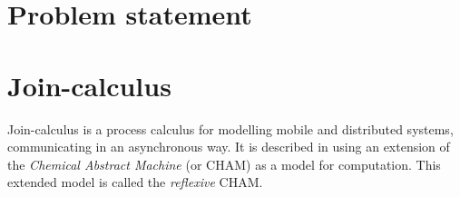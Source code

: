 \section{Problem statement}

\section{Join-calculus}

Join-calculus is a process calculus for modelling mobile and distributed
systems, communicating in an asynchronous way. It is described in
\cite{fournet1996reflexive} using an extension of the \emph{Chemical Abstract
Machine}\cite{berry1989chemical} (or CHAM) as a model for computation. This
extended model is called the \emph{reflexive} CHAM.


